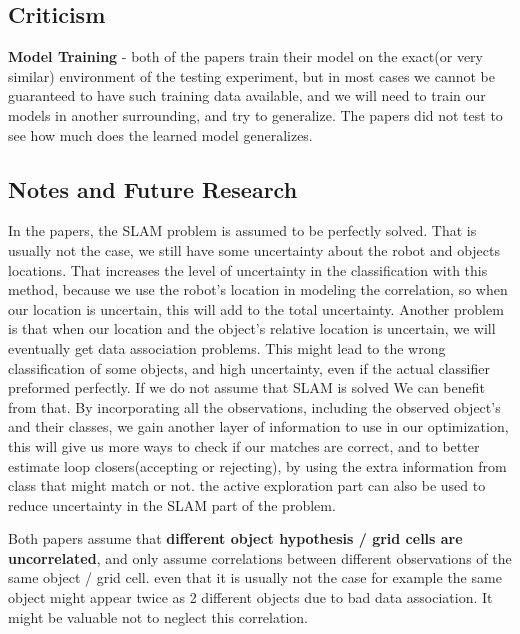 \documentclass{article}
\begin{document}
	
	\subsection{Criticism}
	\textbf{Model Training} - both of the papers train their model on the exact(or very similar) environment of the testing experiment, but in most cases we cannot be guaranteed to have such training data available, and we will need to train our models in another surrounding, and try to generalize. The papers did not test to see how much does the learned model generalizes.  
	
	\subsection{Notes and Future Research}
	
	In the papers, the SLAM problem is assumed to be perfectly solved. That is usually not the case, we still have some uncertainty about the robot and objects locations. That increases the level of uncertainty in the classification with this method, because we use the robot's location in modeling the correlation, so when our location is uncertain, this will add to the total uncertainty.
	Another problem is that when our location and the object's relative location is uncertain, we will eventually get data association problems. This might lead to the wrong classification of some objects, and high uncertainty, even if the actual classifier preformed perfectly.
	If we do not assume that SLAM is solved We can benefit from that.
	By incorporating all the observations, including the observed object's and their classes, we gain another layer of information to use in our optimization, this will give us more ways to check if our matches are correct, and to better estimate loop closers(accepting or rejecting), by using the extra information from class that might match or not. 
	the active exploration part can also be used to reduce uncertainty in the SLAM part of the problem.
	
	Both papers assume that \textbf{different object hypothesis / grid cells are uncorrelated}, and only assume correlations between different observations of the same object / grid cell. even that it is usually not the case for example the same object might appear twice as 2 different objects due to bad data association. It might be valuable not to neglect this correlation. \\
	
  
\end{document}
